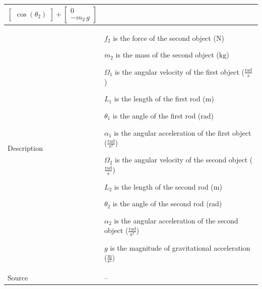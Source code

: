 \documentclass[12pt]{article}
\begin{document}
{\begin{minipage}{\textwidth}
\begin{tabular}{>{\raggedright}p{}>{\raggedright\arraybackslash}p{}}
\begin{displaymath}
{\begin{bmatrix}
                                                                                                                                                                     \cos\left({θ_{2}}\right)
                                                                                                                                                                     \end{bmatrix}+\begin{bmatrix}
                                                                                                                                                                                   0\\
                                                                                                                                                                                   -{m_{2}}\,g
                                                                                                                                                                                   \end{bmatrix}}
           \end{displaymath}
\\ \midrule
Description & \begin{symbDescription}
              \item{${f_{2}}$ is the force of the second object (${\text{N}}$)}
              \item{${m_{2}}$ is the mass of the second object (${\text{kg}}$)}
              \item{${Ω_{1}}$ is the angular velocity of the first object ($\frac{\text{rad}}{\text{s}}$)}
              \item{${L_{1}}$ is the length of the first rod (${\text{m}}$)}
              \item{${θ_{1}}$ is the angle of the first rod (${\text{rad}}$)}
              \item{${α_{1}}$ is the angular acceleration of the first object ($\frac{\text{rad}}{\text{s}^{2}}$)}
              \item{${Ω_{2}}$ is the angular velocity of the second object ($\frac{\text{rad}}{\text{s}}$)}
              \item{${L_{2}}$ is the length of the second rod (${\text{m}}$)}
              \item{${θ_{2}}$ is the angle of the second rod (${\text{rad}}$)}
              \item{${α_{2}}$ is the angular acceleration of the second object ($\frac{\text{rad}}{\text{s}^{2}}$)}
              \item{$g$ is the magnitude of gravitational acceleration ($\frac{\text{m}}{\text{s}^{2}}$)}
              \end{symbDescription}
\\ \midrule
Source & --
         

\end{tabular}
\end{minipage}}
\end{document}
